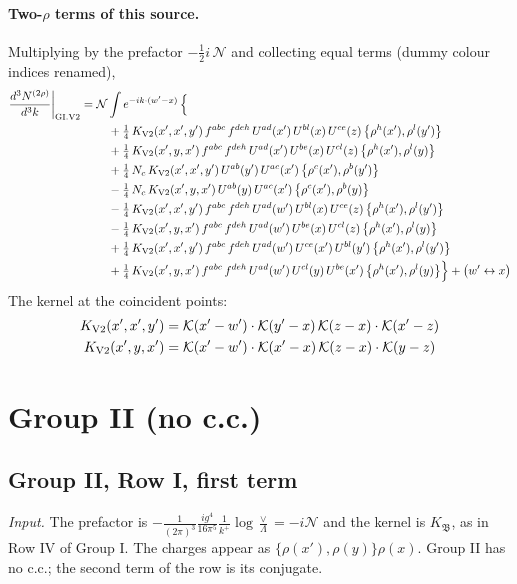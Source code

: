 \documentclass[10pt]{article}
\numberwithin{equation}{section}
\newcommand{\KK}{\mathcal K}
\newcommand{\NN}{\mathcal N}
\begin{document}
\paragraph{Two-$\rho$ terms of this source.} Multiplying by the prefactor $-\tfrac12i\,\NN$ and collecting equal terms (dummy colour indices renamed),
\begin{align}
\frac{d^3N^{(2\rho)}}{d^3k}\bigg|_{\rm GI.V2}={}&\NN\int e^{-ik\cdot(w'-x)}\,\Big\{\notag\\
&\quad +\tfrac14\,K_{\rm V2}(x',x',y')\,f^{abc}\,f^{deh}\,U^{ad}(x')\,U^{bl}(x)\,U^{ce}(z)\,\big\{\rho^{h}(x'),\rho^{l}(y')\big\}\notag\\
&\quad +\tfrac14\,K_{\rm V2}(x',y,x')\,f^{abc}\,f^{deh}\,U^{ad}(x')\,U^{be}(x)\,U^{cl}(z)\,\big\{\rho^{h}(x'),\rho^{l}(y)\big\}\notag\\
&\quad +\tfrac14\,N_{c}\,K_{\rm V2}(x',x',y')\,U^{ab}(y')\,U^{ac}(x')\,\big\{\rho^{c}(x'),\rho^{b}(y')\big\}\notag\\
&\quad -\tfrac14\,N_{c}\,K_{\rm V2}(x',y,x')\,U^{ab}(y)\,U^{ac}(x')\,\big\{\rho^{c}(x'),\rho^{b}(y)\big\}\notag\\
&\quad -\tfrac14\,K_{\rm V2}(x',x',y')\,f^{abc}\,f^{deh}\,U^{ad}(w')\,U^{bl}(x)\,U^{ce}(z)\,\big\{\rho^{h}(x'),\rho^{l}(y')\big\}\notag\\
&\quad -\tfrac14\,K_{\rm V2}(x',y,x')\,f^{abc}\,f^{deh}\,U^{ad}(w')\,U^{be}(x)\,U^{cl}(z)\,\big\{\rho^{h}(x'),\rho^{l}(y)\big\}\notag\\
&\quad +\tfrac14\,K_{\rm V2}(x',x',y')\,f^{abc}\,f^{deh}\,U^{ad}(w')\,U^{ce}(x')\,U^{bl}(y')\,\big\{\rho^{h}(x'),\rho^{l}(y')\big\}\notag\\
&\quad +\tfrac14\,K_{\rm V2}(x',y,x')\,f^{abc}\,f^{deh}\,U^{ad}(w')\,U^{cl}(y)\,U^{be}(x')\,\big\{\rho^{h}(x'),\rho^{l}(y)\big\}\Big\}+\big(w'\leftrightarrow x\big)\label{R:eq:res-GI.V2}
\end{align}
The kernel at the coincident points:
\begin{align*}
K_{\rm V2}(x',x',y')&=\KK(x'-w')\cdot\KK(y'-x)\,\KK(z-x)\cdot\KK(x'-z)\\K_{\rm V2}(x',y,x')&=\KK(x'-w')\cdot\KK(x'-x)\,\KK(z-x)\cdot\KK(y-z)
\end{align*}

\section{Group II (no c.c.)}\label{R:sec:G2}
\subsection{Group II, Row I, first term}\label{R:sec:GII.I1}
\emph{Input.} The prefactor is $-\frac{1}{(2\pi)^3}\frac{ig^4}{16\pi^5}\frac1{k^+}\log\frac\vee\Lambda=-i\NN$ and the kernel is $K_{\mathfrak B}$, as in Row IV of Group I. The charges appear as $\{\rho(x'),\rho(y)\}\rho(x)$. Group II has no c.c.; the second term of the row is its conjugate.
\end{document}
